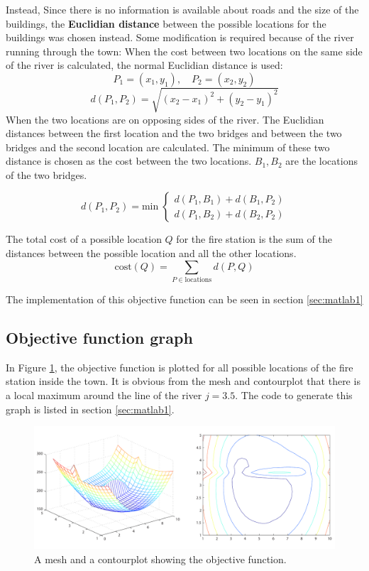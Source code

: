 \documentclass[10pt,a4paper]{article}
\begin{document}
\bigskip

\noindent Instead, Since there is no information is available about roads and the size of the buildings, the \textbf{Euclidian distance} between the possible locations for the buildings was chosen instead. Some modification is required because of the river running through the town: When the cost between two locations on the same side of the river is calculated, the normal Euclidian distance is used: 
\[
P_1 = (x_1, y_1), \quad P_2 = (x_2, y_2)
\]
\[
d(P_1, P_2) = \sqrt{(x_2 - x_1)^2 + (y_2 - y_1 )^2 }
\]
When the two locations are on opposing sides of the river. The Euclidian distances between the first location and the two bridges and between the two bridges and the second location are calculated. The minimum of these two distance is chosen as the cost between the two locations. $B_1, B_2$ are the locations of the two bridges.

\[
d(P_1, P_2) = \text{min} \; \left\{
\begin{array}{l}
d(P_1, B_1) + d(B_1, P_2 )\\
d(P_1, B_2) + d(B_2, P_2 )
\end{array} \right.
\]

\noindent The total cost of a possible location $Q$ for the fire station is the sum of the distances between the possible location and all the other locations.
\[
\text{cost}(Q) = \sum_{P \in \text{locations}} d(P,Q)
\]

\noindent The implementation of this objective function can be seen in section \ref{sec:matlab1}

\subsection{Objective function graph}
In Figure \ref{fig:plots}, the objective function is plotted for all possible locations of the fire station inside the town. It is obvious from the mesh and contourplot that there is a local maximum around the line of the river $j = 3.5$. The code to generate this graph is listed in section \ref{sec:matlab1}.
\begin{figure}[H]
\centering
\includegraphics[width=0.95\linewidth]{images/plots.pdf}
\caption{A mesh and a contourplot showing the objective function.}
\label{fig:plots}
\end{figure}
\end{document}
